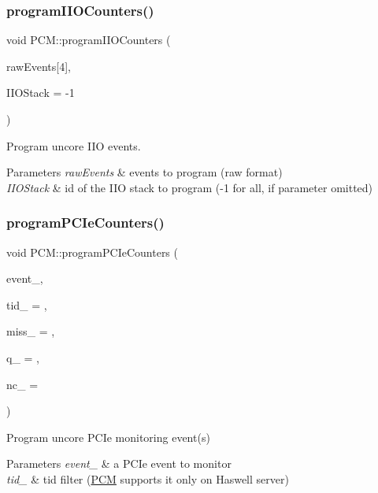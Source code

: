 \subsubsection{\texorpdfstring{program\+I\+I\+O\+Counters()}{programIIOCounters()}}
{\footnotesize\ttfamily void P\+C\+M\+::program\+I\+I\+O\+Counters (\begin{DoxyParamCaption}\item[{\mbox{\hyperlink{struct_i_i_o_p_m_u_c_n_t_c_t_l_register}{I\+I\+O\+P\+M\+U\+C\+N\+T\+C\+T\+L\+Register}}}]{raw\+Events\mbox{[}4\mbox{]},  }\item[{int}]{I\+I\+O\+Stack = {\ttfamily -\/1} }\end{DoxyParamCaption})}



Program uncore I\+IO events. 


\begin{DoxyParams}{Parameters}
{\em raw\+Events} & events to program (raw format) \\
\hline
{\em I\+I\+O\+Stack} & id of the I\+IO stack to program (-\/1 for all, if parameter omitted) \\
\hline
\end{DoxyParams}
\mbox{\label{class_p_c_m_af1b4ebd0ddc3ea32c04cb410f1eb48ad}} 
\subsubsection{\texorpdfstring{program\+P\+C\+Ie\+Counters()}{programPCIeCounters()}}
{\footnotesize\ttfamily void P\+C\+M\+::program\+P\+C\+Ie\+Counters (\begin{DoxyParamCaption}\item[{const P\+C\+Ie\+Event\+Code}]{event\+\_\+,  }\item[{const uint32}]{tid\+\_\+ = {},  }\item[{const uint32}]{miss\+\_\+ = {},  }\item[{const uint32}]{q\+\_\+ = {},  }\item[{const uint32}]{nc\+\_\+ = {} }\end{DoxyParamCaption})}



Program uncore P\+C\+Ie monitoring event(s) 


\begin{DoxyParams}{Parameters}
{\em event\+\_\+} & a P\+C\+Ie event to monitor \\
\hline
{\em tid\+\_\+} & tid filter (\mbox{\hyperlink{class_p_c_m}{P\+CM}} supports it only on Haswell server) \\
\hline
\end{DoxyParams}
\mbox{\label{class_p_c_m_aa2263c70dabe237a8aeb9cdc58736ee5}} 

